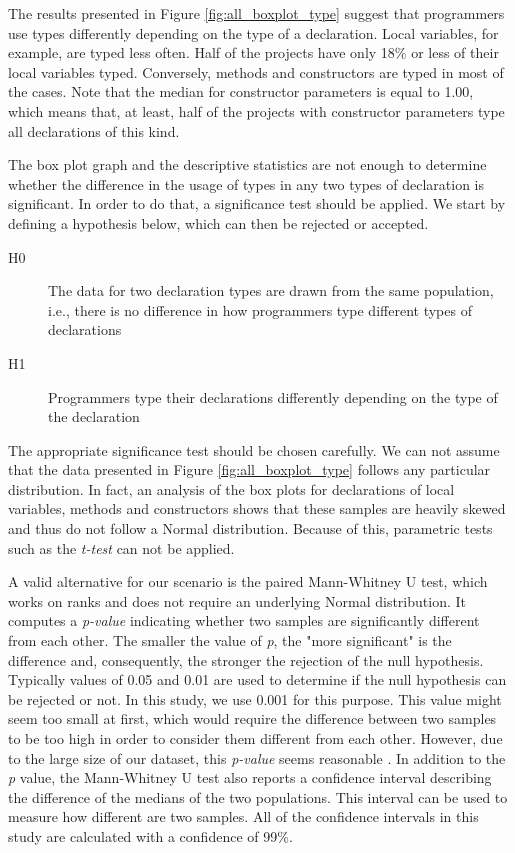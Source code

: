\documentclass[preprint]{sigplanconf}
\begin{document}
The results presented in Figure \ref{fig:all_boxplot_type} suggest that programmers use types differently depending on the type of a declaration.
Local variables, for example, are typed less often.
Half of the projects have only 18\% or less of their local variables typed.
Conversely, methods and constructors are typed in most of the cases.
Note that the median for constructor parameters is equal to 1.00, which means that, at least, half of the projects with constructor parameters type all declarations of this kind.

The box plot graph and the descriptive statistics are not enough to determine whether the difference in the usage of types in any two types of declaration is significant.
In order to do that, a significance test should be applied. 
We start by defining a hypothesis below, which can then be rejected or accepted.

\begin{description}
\item[H0] The data for two declaration types are drawn from the same population, i.e., there is no difference in how programmers type different types of declarations
\item[H1] Programmers type their declarations differently depending on the type of the declaration
\end{description}

The appropriate significance test should be chosen carefully.
We can not assume that the data presented in Figure \ref{fig:all_boxplot_type} follows any particular distribution.
In fact, an analysis of the box plots for declarations of local variables, methods and constructors shows that these samples are heavily skewed and thus do not follow a Normal distribution.
Because of this, parametric tests such as the \emph{t-test} can not be applied.

A valid alternative for our scenario is the paired Mann-Whitney U test, which works on ranks and does not require an underlying Normal distribution.
It computes a \emph{p-value} indicating whether two samples are significantly different from each other.
The smaller the value of \emph{p}, the "more significant" is the difference and, consequently, the stronger the rejection of the null hypothesis.
Typically values of 0.05 and 0.01 are used to determine if the null hypothesis can be rejected or not.
In this study, we use 0.001 for this purpose.
This value might seem too small at first, which would require the difference between two samples to be too high in order to consider them different from each other.
However, due to the large size of our dataset, this \emph{p-value} seems reasonable \cite{labovitz68}.
In addition to the \emph{p} value, the Mann-Whitney U test also reports a confidence interval describing the difference of the medians of the two  populations.
This interval can be used to measure how different are two samples.
All of the confidence intervals in this study are calculated with a confidence of 99\%.
\end{document}
